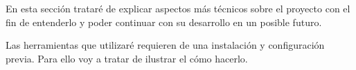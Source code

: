 
En esta sección trataré de explicar aspectos más técnicos sobre el proyecto con el fin de entenderlo y poder continuar con su desarrollo en un posible futuro.

Las herramientas que utilizaré requieren de una instalación y configuración 
previa. Para ello voy a  tratar de ilustrar el cómo hacerlo.


